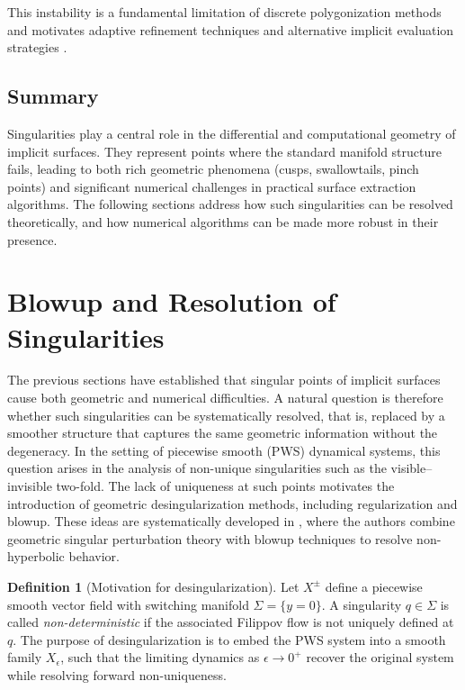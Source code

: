 \documentclass[12pt, a4paper, oneside]{book}
\theoremstyle{plain}
\theoremstyle{definition}
\newtheorem{definition}[theorem]{Definition}
\theoremstyle{remark}
\theoremstyle{definition}
\begin{document}
This instability is a fundamental limitation of discrete polygonization methods and
motivates adaptive refinement techniques and alternative implicit evaluation strategies
\cite{bloomenthal2000implicit}.

\subsection*{Summary}

Singularities play a central role in the differential and computational geometry of
implicit surfaces. They represent points where the standard manifold structure fails,
leading to both rich geometric phenomena (cusps, swallowtails, pinch points) and
significant numerical challenges in practical surface extraction algorithms. The following
sections address how such singularities can be resolved theoretically, and how numerical
algorithms can be made more robust in their presence.

\section{Blowup and Resolution of Singularities}

The previous sections have established that singular points of implicit surfaces cause
both geometric and numerical difficulties. A natural question is therefore whether such
singularities can be systematically resolved, that is, replaced by a smoother structure
that captures the same geometric information without the degeneracy. In the setting of
piecewise smooth (PWS) dynamical systems, this question arises in the analysis of
non-unique singularities such as the visible--invisible two-fold. The lack of uniqueness
at such points motivates the introduction of geometric desingularization methods,
including regularization and blowup. These ideas are systematically developed in
\cite{kristiansen2019resolution}, where the authors combine geometric singular
perturbation theory with blowup techniques to resolve non-hyperbolic behavior.

\begin{definition}[Motivation for desingularization]
Let $X^\pm$ define a piecewise smooth vector field with switching manifold
$\Sigma = \{y=0\}$. A singularity $q \in \Sigma$ is called \emph{non-deterministic} if
the associated Filippov flow is not uniquely defined at $q$. The purpose of
desingularization is to embed the PWS system into a smooth family $X_\epsilon$, such
that the limiting dynamics as $\epsilon \to 0^+$ recover the original system while
resolving forward non-uniqueness.
\end{definition}
\end{document}
